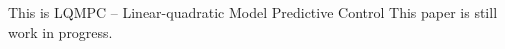 This is LQMPC -- Linear-quadratic Model Predictive Control
This paper is still work in progress.
\\ 